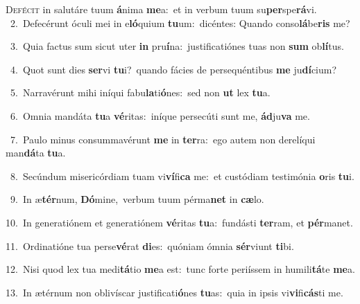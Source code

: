 \lettrine{\initial\textcolor{\initialcolor}{D}}{efécit} in salutáre tuum \textbf{á}\-nima \textbf{me}\-a:~\star et in verbum tuum su\-\textbf{per}\-spe\-\textbf{rá}\-vi.\\
{\numbfont\textcolor{\numbcolor}{~2.}}~Defecérunt óculi mei in e\-\textbf{ló}\-quium \textbf{tu}\-um:~\star dicéntes: Quando conso\-\textbf{lá}\-be\textbf{ris} me?\par
{\numbfont\textcolor{\numbcolor}{~3.}}~Quia factus sum sicut uter \textbf{in} pru\-\textbf{í}\-na:~\star justificatiónes tuas non \textbf{sum} ob\-\textbf{lí}\-tus.\par
{\numbfont\textcolor{\numbcolor}{~4.}}~Quot sunt dies \textbf{ser}\-vi \textbf{tu}\-i?~\star quando fácies de persequéntibus \textbf{me} ju\-\textbf{dí}\-cium?\par
{\numbfont\textcolor{\numbcolor}{~5.}}~Narravérunt mihi iníqui fabu\-\textbf{la}\-ti\-\textbf{ó}\-nes:~\star sed non \textbf{ut} lex \textbf{tu}\-a.\par
{\numbfont\textcolor{\numbcolor}{~6.}}~Omnia mandáta \textbf{tu}\-a \textbf{vé}\-ritas:~\star iníque persecúti sunt me, \textbf{ád}\-ju\textbf{va} me.\par
{\numbfont\textcolor{\numbcolor}{~7.}}~Paulo minus consummavérunt \textbf{me} in \textbf{ter}\-ra:~\star ego autem non derelíqui man\-\textbf{dá}\-ta \textbf{tu}\-a.\par
{\numbfont\textcolor{\numbcolor}{~8.}}~Secúndum misericórdiam tuam vi\-\textbf{ví}\-fi\textbf{ca} me:~\star et custódiam testimónia \textbf{o}\-ris \textbf{tu}\-i.\par
{\numbfont\textcolor{\numbcolor}{~9.}}~In æ\-\textbf{tér}\-num, \textbf{Dó}\-mine,~\star verbum tuum pérma\textbf{net} in \textbf{cæ}\-lo.\par
{\numbfont\textcolor{\numbcolor}{10.}}~In generatiónem et generatiónem \textbf{vé}\-ritas \textbf{tu}\-a:~\star fundásti \textbf{ter}\-ram, et \textbf{pér}\-manet.\par
{\numbfont\textcolor{\numbcolor}{11.}}~Ordinatióne tua perse\-\textbf{vé}\-rat \textbf{di}\-es:~\star quóniam ómnia \textbf{sér}\-viunt \textbf{ti}\-bi.\par
{\numbfont\textcolor{\numbcolor}{12.}}~Nisi quod lex tua medi\-\textbf{tá}\-tio \textbf{me}\-a est:~\star tunc forte periíssem in humili\-\textbf{tá}\-te \textbf{me}\-a.\par
{\numbfont\textcolor{\numbcolor}{13.}}~In ætérnum non oblivíscar justificati\-\textbf{ó}\-nes \textbf{tu}\-as:~\star quia in ipsis vi\-\textbf{vi}\-fi\-\textbf{cás}\-ti me.\par
